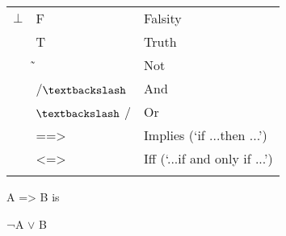 \documentclass[12pt]{article}
\renewcommand{\_}{\kern-1.5pt\textunderscore\kern-1.5pt}
\begin{document}
\begin{table}[H]
 			\centering
\begin{tabular}{p{0.25in}p{0.37in}p{1.71in}}
\multicolumn{1}{p{0.25in}}{{\fontsize{13pt}{15.6pt}\selectfont $\bot$ }} & 
\multicolumn{1}{p{0.37in}}{{\fontsize{13pt}{15.6pt}\selectfont F}} & 
\multicolumn{1}{p{1.71in}}{{\fontsize{13pt}{15.6pt}\selectfont Falsity}} \\
\hhline{~~~}
\multicolumn{1}{p{0.25in}}{{\fontsize{13pt}{15.6pt}\selectfont ⊤}} & 
\multicolumn{1}{p{0.37in}}{{\fontsize{13pt}{15.6pt}\selectfont T}} & 
\multicolumn{1}{p{1.71in}}{{\fontsize{13pt}{15.6pt}\selectfont Truth}} \\
\hhline{~~~}
\multicolumn{1}{p{0.25in}}{{\fontsize{13pt}{15.6pt}\selectfont ¬}} & 
\multicolumn{1}{p{0.37in}}{{\fontsize{13pt}{15.6pt}\selectfont ̃}} & 
\multicolumn{1}{p{1.71in}}{{\fontsize{13pt}{15.6pt}\selectfont Not}} \\
\hhline{~~~}
\multicolumn{1}{p{0.25in}}{{\fontsize{13pt}{15.6pt}\selectfont $\wedge$ }} & 
\multicolumn{1}{p{0.37in}}{{\fontsize{13pt}{15.6pt}\selectfont /$\textbackslash$ }} & 
\multicolumn{1}{p{1.71in}}{{\fontsize{13pt}{15.6pt}\selectfont And}} \\
\hhline{~~~}
\multicolumn{1}{p{0.25in}}{{\fontsize{13pt}{15.6pt}\selectfont $ \vee $ }} & 
\multicolumn{1}{p{0.37in}}{{\fontsize{13pt}{15.6pt}\selectfont $\textbackslash$ /}} & 
\multicolumn{1}{p{1.71in}}{{\fontsize{13pt}{15.6pt}\selectfont Or}} \\
\hhline{~~~}
\multicolumn{1}{p{0.25in}}{{\fontsize{13pt}{15.6pt}\selectfont $ \Rightarrow $ }} & 
\multicolumn{1}{p{0.37in}}{{\fontsize{13pt}{15.6pt}\selectfont ==>}} & 
\multicolumn{1}{p{1.71in}}{{\fontsize{13pt}{15.6pt}\selectfont Implies (‘if ...then ...’)}} \\
\hhline{~~~}
\multicolumn{1}{p{0.25in}}{{\fontsize{13pt}{15.6pt}\selectfont $ \Leftrightarrow $ }} & 
\multicolumn{1}{p{0.37in}}{{\fontsize{13pt}{15.6pt}\selectfont <=>}} & 
\multicolumn{1}{p{1.71in}}{{\fontsize{13pt}{15.6pt}\selectfont Iff (‘...if and only if ...’)}} \\
\hhline{~~~}

\end{tabular}
 \end{table}



{\fontsize{14pt}{16.8pt}\selectfont A => B is {\fontsize{13pt}{15.6pt}\selectfont ¬A $ \vee $  B\par}\par}\par
\end{document}
